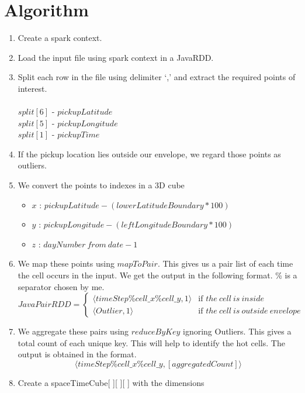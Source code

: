 \section{Algorithm}
\begin{enumerate}
\item Create a spark context.
\item Load the input file using spark context in a JavaRDD.
\item Split each row in the file using delimiter `,' and extract the required points of interest.\\ \\
$split[6]$ - $pickupLatitude$ \\
$split[5]$ - $pickupLongitude$ \\
$split[1]$ - $pickupTime$ \\
\item If the pickup location lies outside our envelope, we regard those points as outliers.
\item We convert the points to indexes in a 3D cube
\begin{itemize}
\item $x$ : $pickupLatitude - (lowerLatitudeBoundary * 100)$
\item $y$ : $pickupLongitude - (leftLongitudeBoundary * 100)$
\item $z$ : $dayNumber\ from\ date - 1$
\end{itemize}
\item We map these points using $mapToPair$. This gives us a pair list of each time the cell occurs in the input. We get the output in the following format. \% is a separator chosen by me.
\begin{equation*}
JavaPairRDD = \left.
\begin{cases}
\langle timeStep\%cell\_x\%cell\_y, 1  \rangle & \text{if } the\ cell\ is\ inside \\
\langle Outlier, 1  \rangle & \text{if } the\ cell\ is\ outside\ envelope
\end{cases}
\right.
\end{equation*}
\item We aggregate these pairs using $reduceByKey$ ignoring Outliers. This gives a total count of each unique key. This will help to identify the hot cells. The output is obtained in the format.
\begin{equation*}
\langle timeStep\%cell\_x\%cell\_y, [aggregatedCount]  \rangle
\end{equation*}
\item Create a spaceTimeCube[ ][ ][ ] with the dimensions

\end{enumerate}
